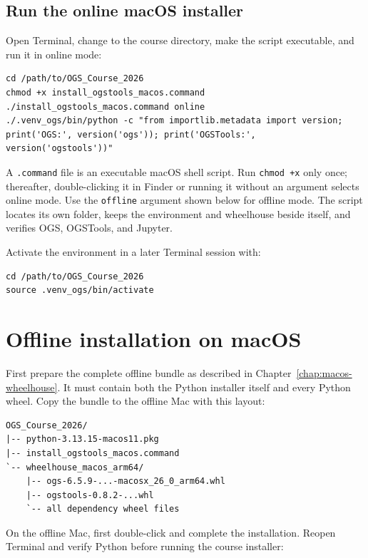 \documentclass[11pt,a4paper]{tubaf-report}
\begin{document}
\subsection{Run the online macOS installer}

Open Terminal, change to the course directory, make the script executable, and
run it in online mode:

\begin{lstlisting}[style=terminal]
cd /path/to/OGS_Course_2026
chmod +x install_ogstools_macos.command
./install_ogstools_macos.command online
./.venv_ogs/bin/python -c "from importlib.metadata import version; print('OGS:', version('ogs')); print('OGSTools:', version('ogstools'))"
\end{lstlisting}

A \texttt{.command} file is an executable macOS shell script. Run
\texttt{chmod +x} only once; thereafter, double-clicking it in Finder or running
it without an argument selects online mode. Use the \texttt{offline} argument
shown below for offline mode. The script locates its own folder, keeps the
environment and wheelhouse beside itself, and verifies OGS, OGSTools, and Jupyter.

Activate the environment in a later Terminal session with:

\begin{lstlisting}[style=terminal]
cd /path/to/OGS_Course_2026
source .venv_ogs/bin/activate
\end{lstlisting}

\section{Offline installation on macOS}

First prepare the complete offline bundle as described in
Chapter~\ref{chap:macos-wheelhouse}. It must contain both the Python installer
itself and every Python wheel. Copy the bundle to the offline Mac with this
layout:

\begin{lstlisting}[style=terminal]
OGS_Course_2026/
|-- python-3.13.15-macos11.pkg
|-- install_ogstools_macos.command
`-- wheelhouse_macos_arm64/
    |-- ogs-6.5.9-...-macosx_26_0_arm64.whl
    |-- ogstools-0.8.2-...whl
    `-- all dependency wheel files
\end{lstlisting}

On the offline Mac, first double-click
 and complete the installation. Reopen Terminal
and verify Python before running the course installer:
\end{document}
